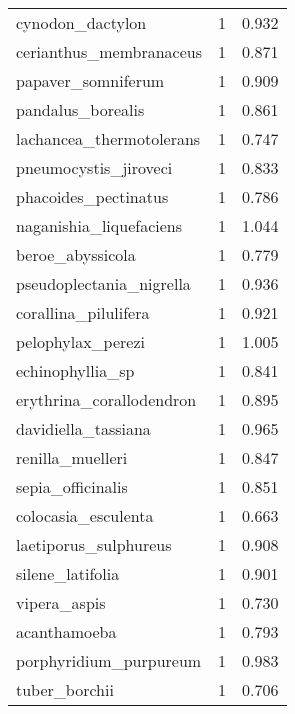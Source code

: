 \begin{tabular}{lrr}
               cynodon\_dactylon &                   1 &     0.932 \\
        cerianthus\_membranaceus &                   1 &     0.871 \\
             papaver\_somniferum &                   1 &     0.909 \\
              pandalus\_borealis &                   1 &     0.861 \\
       lachancea\_thermotolerans &                   1 &     0.747 \\
          pneumocystis\_jiroveci &                   1 &     0.833 \\
           phacoides\_pectinatus &                   1 &     0.786 \\
        naganishia\_liquefaciens &                   1 &     1.044 \\
               beroe\_abyssicola &                   1 &     0.779 \\
       pseudoplectania\_nigrella &                   1 &     0.936 \\
           corallina\_pilulifera &                   1 &     0.921 \\
              pelophylax\_perezi &                   1 &     1.005 \\
               echinophyllia\_sp &                   1 &     0.841 \\
       erythrina\_corallodendron &                   1 &     0.895 \\
            davidiella\_tassiana &                   1 &     0.965 \\
               renilla\_muelleri &                   1 &     0.847 \\
              sepia\_officinalis &                   1 &     0.851 \\
            colocasia\_esculenta &                   1 &     0.663 \\
          laetiporus\_sulphureus &                   1 &     0.908 \\
               silene\_latifolia &                   1 &     0.901 \\
                   vipera\_aspis &                   1 &     0.730 \\
                   acanthamoeba &                   1 &     0.793 \\
         porphyridium\_purpureum &                   1 &     0.983 \\
                  tuber\_borchii &                   1 &     0.706 \\

\end{tabular}
